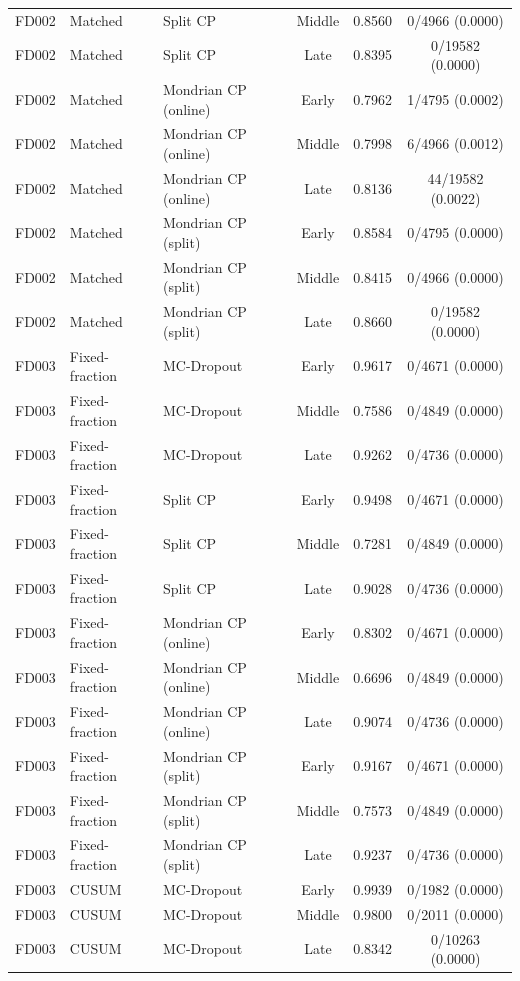 \begin{table}[t]
\begin{tabular}{lllccc}
FD002 & Matched & Split CP & Middle & 0.8560 & 0/4966 (0.0000) \\
FD002 & Matched & Split CP & Late & 0.8395 & 0/19582 (0.0000) \\
FD002 & Matched & Mondrian CP (online) & Early & 0.7962 & 1/4795 (0.0002) \\
FD002 & Matched & Mondrian CP (online) & Middle & 0.7998 & 6/4966 (0.0012) \\
FD002 & Matched & Mondrian CP (online) & Late & 0.8136 & 44/19582 (0.0022) \\
FD002 & Matched & Mondrian CP (split) & Early & 0.8584 & 0/4795 (0.0000) \\
FD002 & Matched & Mondrian CP (split) & Middle & 0.8415 & 0/4966 (0.0000) \\
FD002 & Matched & Mondrian CP (split) & Late & 0.8660 & 0/19582 (0.0000) \\
FD003 & Fixed-fraction & MC-Dropout & Early & 0.9617 & 0/4671 (0.0000) \\
FD003 & Fixed-fraction & MC-Dropout & Middle & 0.7586 & 0/4849 (0.0000) \\
FD003 & Fixed-fraction & MC-Dropout & Late & 0.9262 & 0/4736 (0.0000) \\
FD003 & Fixed-fraction & Split CP & Early & 0.9498 & 0/4671 (0.0000) \\
FD003 & Fixed-fraction & Split CP & Middle & 0.7281 & 0/4849 (0.0000) \\
FD003 & Fixed-fraction & Split CP & Late & 0.9028 & 0/4736 (0.0000) \\
FD003 & Fixed-fraction & Mondrian CP (online) & Early & 0.8302 & 0/4671 (0.0000) \\
FD003 & Fixed-fraction & Mondrian CP (online) & Middle & 0.6696 & 0/4849 (0.0000) \\
FD003 & Fixed-fraction & Mondrian CP (online) & Late & 0.9074 & 0/4736 (0.0000) \\
FD003 & Fixed-fraction & Mondrian CP (split) & Early & 0.9167 & 0/4671 (0.0000) \\
FD003 & Fixed-fraction & Mondrian CP (split) & Middle & 0.7573 & 0/4849 (0.0000) \\
FD003 & Fixed-fraction & Mondrian CP (split) & Late & 0.9237 & 0/4736 (0.0000) \\
FD003 & CUSUM & MC-Dropout & Early & 0.9939 & 0/1982 (0.0000) \\
FD003 & CUSUM & MC-Dropout & Middle & 0.9800 & 0/2011 (0.0000) \\
FD003 & CUSUM & MC-Dropout & Late & 0.8342 & 0/10263 (0.0000) \\

\end{tabular}
\end{table}
